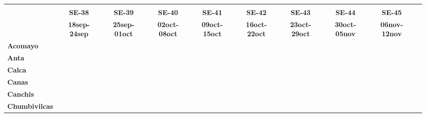 \begin{tabular}{lccccccccc}
	\textbf{}              	  
	& \multicolumn{1}{l}{}                        
	& \multicolumn{1}{l}{}      
	& \multicolumn{1}{l}{}                         
	& \multicolumn{1}{l}{}                         
	& \multicolumn{1}{l}{}                         
	& \multicolumn{1}{l}{}                        
	& \multicolumn{1}{l}{}                         
	& \multicolumn{1}{l}{} \\                   
	\textbf{}  															
	&\textbf{SE-38}
	&\textbf{SE-39}
	&\textbf{SE-40}
	&\textbf{SE-41}
	&\textbf{SE-42}
	&\textbf{SE-43}	
	&\textbf{SE-44}	
	&\textbf{SE-45} \\							
	\textbf{}      							
	&\textbf{18sep-24sep} 
	&\textbf{25sep-01oct} 
	&\textbf{02oct-08oct}
	&\textbf{09oct-15oct}
	&\textbf{16oct-22oct}
	&\textbf{23oct-29oct}
	&\textbf{30oct-05nov}
	&\textbf{06nov-12nov}\\
	\textbf{Acomayo}                        												
	&\cellcolor[HTML]{FCC46C}
	&\cellcolor[HTML]{FCC46C}					
	&\cellcolor[HTML]{FCC46C}
	&\cellcolor[HTML]{FCC46C}					
	&\cellcolor[HTML]{FCC46C}
	&\cellcolor[HTML]{FCC46C} 
	&\cellcolor[HTML]{FCC46C}
	&\cellcolor[HTML]{FCC46C}\\
	\textbf{Anta}                                                  							&\cellcolor[HTML]{FCC46C}						
	&\cellcolor[HTML]{FCC46C}					
	&\cellcolor[HTML]{FCC46C}					
	&\cellcolor[HTML]{FCC46C}					
	&\cellcolor[HTML]{FCC46C}
	&\cellcolor[HTML]{FCC46C}	
	&\cellcolor[HTML]{FCC46C}
	&\cellcolor[HTML]{FCC46C}\\					
	\textbf{Calca} 
	&\cellcolor[HTML]{FCC46C}											
	&\cellcolor[HTML]{FCC46C}
	&\cellcolor[HTML]{FCC46C}
	&\cellcolor[HTML]{FCC46C}
	&\cellcolor[HTML]{FCC46C}
	&\cellcolor[HTML]{FCC46C}
	&\cellcolor[HTML]{FCC46C}
	&\cellcolor[HTML]{FCC46C}\\          			
	\textbf{Canas}     			
	&\cellcolor[HTML]{FCC46C}					
	&\cellcolor[HTML]{FCC46C}
	&\cellcolor[HTML]{FCC46C}	
	&\cellcolor[HTML]{FCC46C}
	&\cellcolor[HTML]{FCC46C}
	&\cellcolor[HTML]{FCC46C}
	&\cellcolor[HTML]{FCC46C}
	&\cellcolor[HTML]{FCC46C}\\	
	\textbf{Canchis}   							
	&\cellcolor[HTML]{FCC46C}
	&\cellcolor[HTML]{FCC46C}
	&\cellcolor[HTML]{FCC46C}
	&\cellcolor[HTML]{FCC46C}
	&\cellcolor[HTML]{FCC46C}
	&\cellcolor[HTML]{FCC46C}
	&\cellcolor[HTML]{FCC46C}
	&\cellcolor[HTML]{FCC46C}\\											
	\textbf{Chumbivilcas}                      												
	&\cellcolor[HTML]{FCC46C}

\end{tabular}
